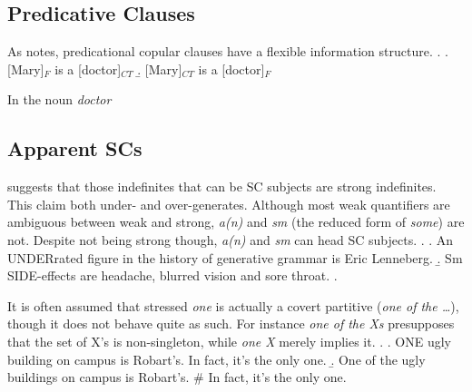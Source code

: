 \documentclass[GPFinal]{subfiles}
\begin{document}
\subsection{Predicative Clauses}
As \textcite{mikkelsen2004specifying} notes, predicational copular clauses have a flexible information structure.
\ex.
\a. [Mary]$_F$ is a [doctor]$_{CT}$
\b. [Mary]$_{CT}$ is a [doctor]$_F$

In \Last[a] the noun \textit{doctor}
\subsection{Apparent SCs}
\textcite{heycock2012specification} suggests that those indefinites that can be SC subjects are strong indefinites.
This claim both under- and over-generates.
Although most weak quantifiers are ambiguous between weak and strong, \textit{a(n)} and \textit{sm} (the reduced form of \textit{some}) are not.
Despite not being strong though, \textit{a(n)} and \textit{sm} can head SC subjects.
\ex.
\a. An UNDERrated figure in the history of generative grammar is Eric Lenneberg.
\b. Sm SIDE-effects are headache, blurred vision and sore throat.
\z.

It is often assumed that stressed \textit{one} is actually a covert partitive (\textit{one of the \ldots}), though it does not behave quite as such.
For instance \textit{one of the Xs} presupposes that the set of X's is non-singleton, while \textit{one X} merely implies it.
\ex.
\a. ONE ugly building on campus is Robart's. In fact, it's the only one.
\b. One of the ugly buildings on campus is Robart's. \# In fact, it's the only one.
\end{document}
